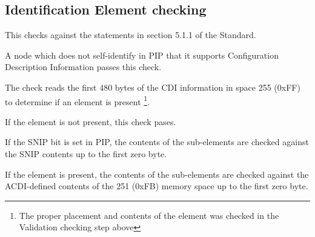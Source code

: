 \subsection{Identification Element checking}

This checks against the statements in section 5.1.1 of the Standard.

A node which does not self-identify in PIP that it supports
Configuration Description Information passes this check.
\pipsetFootnote

The check reads the first 480 bytes of the CDI information in space 255 (0xFF) to 
determine if an  element is present
\footnote{The proper placement and contents of the  element
was checked in the Validation checking step above}.  

If the  element is not present, this check pases.

If the SNIP bit is set in PIP, the contents of the 
sub-elements are checked against the SNIP contents
up to the first zero byte.

If the  element is present, the contents of the 
 sub-elements are checked against the ACDI-defined
contents of the 251 (0xFB) memory space up to the first zero byte.

  
